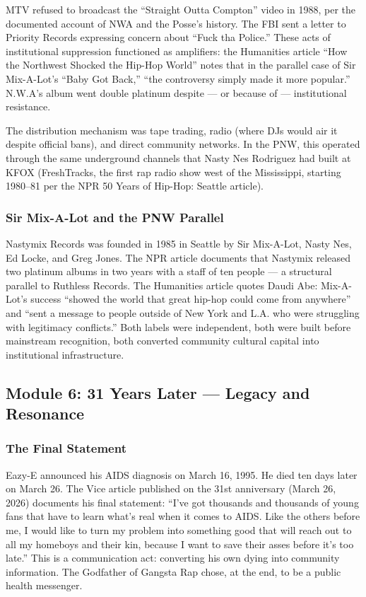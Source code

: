 \documentclass[11pt,letterpaper]{article}
\begin{document}
MTV refused to broadcast the ``Straight Outta Compton'' video in 1988, per the documented account of NWA and the Posse's history. The FBI sent a letter to Priority Records expressing concern about ``Fuck tha Police.'' These acts of institutional suppression functioned as amplifiers: the Humanities article ``How the Northwest Shocked the Hip-Hop World'' notes that in the parallel case of Sir Mix-A-Lot's ``Baby Got Back,'' ``the controversy simply made it more popular.'' N.W.A's album went double platinum despite --- or because of --- institutional resistance.

The distribution mechanism was tape trading, radio (where DJs would air it despite official bans), and direct community networks. In the PNW, this operated through the same underground channels that Nasty Nes Rodriguez had built at KFOX (FreshTracks, the first rap radio show west of the Mississippi, starting 1980--81 per the NPR 50 Years of Hip-Hop: Seattle article).

\subsubsection{Sir Mix-A-Lot and the PNW Parallel}

Nastymix Records was founded in 1985 in Seattle by Sir Mix-A-Lot, Nasty Nes, Ed Locke, and Greg Jones. The NPR article documents that Nastymix released two platinum albums in two years with a staff of ten people --- a structural parallel to Ruthless Records. The Humanities article quotes Daudi Abe: Mix-A-Lot's success ``showed the world that great hip-hop could come from anywhere'' and ``sent a message to people outside of New York and L.A. who were struggling with legitimacy conflicts.'' Both labels were independent, both were built before mainstream recognition, both converted community cultural capital into institutional infrastructure.

\subsection{Module 6: 31 Years Later --- Legacy and Resonance}

\subsubsection{The Final Statement}

Eazy-E announced his AIDS diagnosis on March 16, 1995. He died ten days later on March 26. The Vice article published on the 31st anniversary (March 26, 2026) documents his final statement: ``I've got thousands and thousands of young fans that have to learn what's real when it comes to AIDS. Like the others before me, I would like to turn my problem into something good that will reach out to all my homeboys and their kin, because I want to save their asses before it's too late.'' This is a communication act: converting his own dying into community information. The Godfather of Gangsta Rap chose, at the end, to be a public health messenger.
\end{document}
